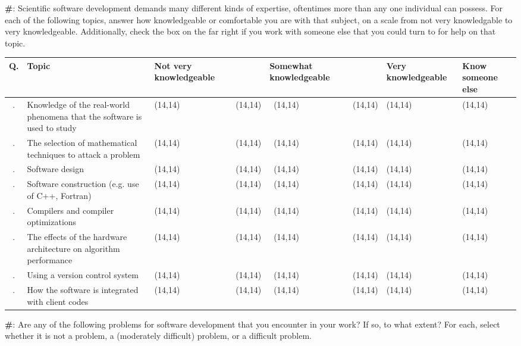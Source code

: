 \documentclass[12pt, letterpaper]{article}
\newcommand{\incrcounter}[1]{\addtocounter{#1}{1}}
\newcounter{questionnum}
\newcounter{subquestionnum}
\newcommand{\question}[2]{\setcounter{subquestionnum}{0} \textbf{\#\thequestionnum}: #1 #2}
\newcommand{\likertsix}[1]{
    \hfill \relax\thequestionnum.\thesubquestionnum\hfill\hfill &\textsf{#1} &{ \framebox(14,14){} } & { \framebox(14,14){} } &{\ \framebox(14,14){} } & { \framebox(14,14){}} & { \framebox(14,14){}} & { \framebox(14,14){}} \incrcounter{subquestionnum}\\ \hline
}
\newcommand{\divider}{\hline}
\begin{document}
	\pagebreak
	
	\question{Scientific software development demands many different kinds of expertise, oftentimes more than any one individual can possess. For each of the following topics, answer how knowledgeable or comfortable you are with that subject, on a scale from not very knowledgable to very knowledgeable. Additionally, check the box on the far right if you work with someone else that you could turn to for help on that topic.}
	
	{
		\begin{longtable}{|c| p{6cm} | p{1.25cm} p{1.25cm} p{1.25cm} p{1.25cm} p{1.25cm} || p{1.25cm} |}
			\divider
			Q.     & Topic & Not very knowledgeable & & Somewhat knowledgeable & & Very knowledgeable & Know someone else \\
			\divider\divider
			
			\likertsix{Knowledge of the real-world phenomena that the software is used to study}
			
			\likertsix{The selection of mathematical techniques to attack a problem}
			
			\likertsix{Software design}
			\likertsix{Software construction (e.g. use of C++, Fortran)}
			
			\likertsix{Compilers and compiler optimizations}
			\likertsix{The effects of the hardware architecture on algorithm performance}
			\likertsix{Using a version control system}
			
			\likertsix{How the software is integrated with client codes}
			
		\end{longtable}
	} \incrcounter{questionnum}
	
	\pagebreak
	
	
	\question{Are any of the following problems for software development that you encounter in your work? If so, to what extent? For each, select whether it is not a problem, a (moderately difficult) problem, or a difficult problem. }
	
\end{document}
